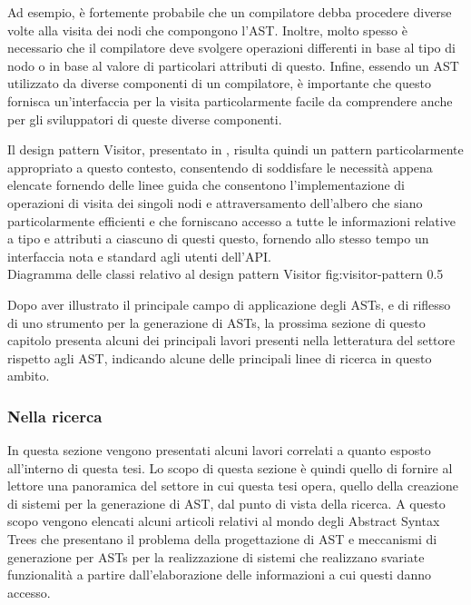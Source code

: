 Ad esempio, è fortemente probabile che un compilatore debba procedere diverse
volte alla visita dei nodi che compongono l’AST. Inoltre, molto spesso è
necessario che il compilatore deve svolgere operazioni differenti in base al
tipo di nodo o in base al valore di particolari attributi di questo. Infine,
essendo un AST utilizzato da diverse componenti di un compilatore, è importante
che questo fornisca un’interfaccia per la visita particolarmente facile da
comprendere anche per gli sviluppatori di queste diverse componenti.

Il design pattern Visitor, presentato in \cite{gamma1995design}, risulta quindi
un pattern particolarmente appropriato a questo contesto, consentendo di
soddisfare le necessità appena elencate fornendo delle linee guida che
consentono l’implementazione di operazioni di visita dei singoli nodi e
attraversamento dell’albero che siano particolarmente efficienti e che
forniscano accesso a tutte le informazioni relative a tipo e attributi a
ciascuno di questi questo, fornendo allo stesso tempo un interfaccia nota e
standard agli utenti dell’API.\\

      {Diagramma delle classi relativo al design pattern Visitor}
      {fig:visitor-pattern}
      {0.5}

Dopo aver illustrato il principale campo di applicazione degli ASTs, e di
riflesso di uno strumento per la generazione di ASTs, la prossima sezione di
questo capitolo presenta alcuni dei principali lavori presenti nella
letteratura del settore rispetto agli AST, indicando alcune delle principali
linee di ricerca in questo ambito.

\subsubsection{Nella ricerca}

In questa sezione vengono presentati alcuni lavori correlati a quanto esposto
all’interno di questa tesi. Lo scopo di questa sezione è quindi quello di
fornire al lettore una panoramica del settore in cui questa tesi opera, quello
della creazione di sistemi per la generazione di AST, dal punto di vista della
ricerca. A questo scopo vengono elencati alcuni articoli relativi al mondo
degli Abstract Syntax Trees che presentano il problema della progettazione di
AST  e meccanismi di generazione per ASTs per la realizzazione di sistemi che
realizzano svariate funzionalità a partire dall’elaborazione delle informazioni
a cui questi danno accesso.\\

